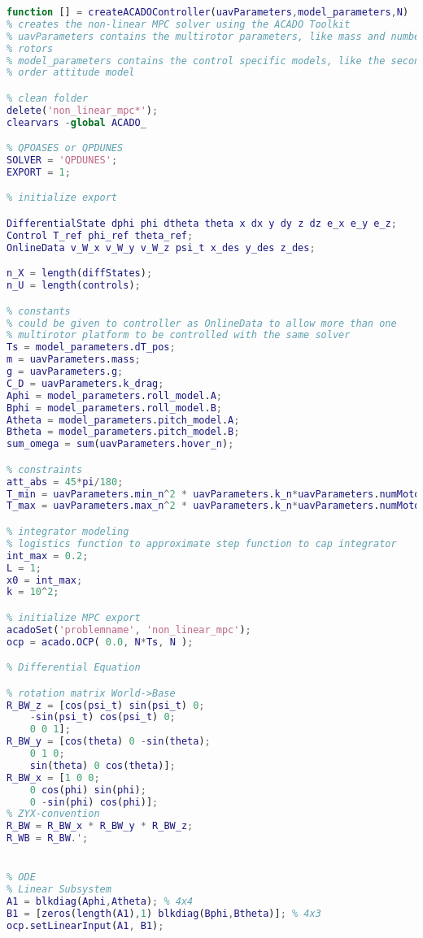 \begin{lstlisting}[frame=single,language={Matlab},caption={MATLAB code for ACADO solver generation}]
function [] = createACADOController(uavParameters,model_parameters,N)
% creates the non-linear MPC solver using the ACADO Toolkit
% uavParameters contains the multirotor parameters, like mass and number of
% rotors
% model_parameters contains the control specific models, like the second 
% order attitude model

% clean folder
delete('non_linear_mpc*');
clearvars -global ACADO_

% QPOASES or QPDUNES
SOLVER = 'QPDUNES';
EXPORT = 1;

% initialize export

DifferentialState dphi phi dtheta theta x dx y dy z dz e_x e_y e_z;
Control T_ref phi_ref theta_ref;
OnlineData v_W_x v_W_y v_W_z psi_t x_des y_des z_des;

n_X = length(diffStates);
n_U = length(controls);

% constants
% could be given to controller as OnlineData to allow more than one
% multirotor platform to be controlled with the same solver
Ts = model_parameters.dT_pos;
m = uavParameters.mass; 
g = uavParameters.g;
C_D = uavParameters.k_drag;
Aphi = model_parameters.roll_model.A;
Bphi = model_parameters.roll_model.B;
Atheta = model_parameters.pitch_model.A;
Btheta = model_parameters.pitch_model.B;
sum_omega = sum(uavParameters.hover_n);

% constraints
att_abs = 45*pi/180;
T_min = uavParameters.min_n^2 * uavParameters.k_n*uavParameters.numMotors;
T_max = uavParameters.max_n^2 * uavParameters.k_n*uavParameters.numMotors;

% integrator modeling
% logistics function to approximate step function to cap integrator
int_max = 0.2;
L = 1;
x0 = int_max;
k = 10^2;

% initialize MPC export
acadoSet('problemname', 'non_linear_mpc');
ocp = acado.OCP( 0.0, N*Ts, N );

% Differential Equation

% rotation matrix World->Base
R_BW_z = [cos(psi_t) sin(psi_t) 0;
    -sin(psi_t) cos(psi_t) 0;
    0 0 1];
R_BW_y = [cos(theta) 0 -sin(theta);
    0 1 0;
    sin(theta) 0 cos(theta)];
R_BW_x = [1 0 0;
    0 cos(phi) sin(phi);
    0 -sin(phi) cos(phi)];
% ZYX-convention
R_BW = R_BW_x * R_BW_y * R_BW_z;
R_WB = R_BW.';


% ODE
% Linear Subsystem
A1 = blkdiag(Aphi,Atheta); % 4x4
B1 = [zeros(length(A1),1) blkdiag(Bphi,Btheta)]; % 4x3
ocp.setLinearInput(A1, B1);


\end{lstlisting}
